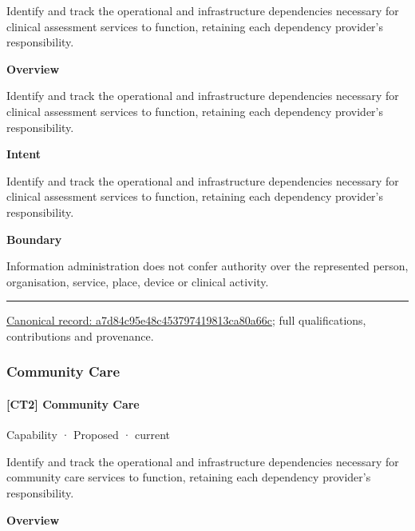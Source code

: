 Identify and track the operational and infrastructure dependencies necessary for clinical assessment services to function, retaining each dependency provider's responsibility.



\textbf{Overview}



Identify and track the operational and infrastructure dependencies necessary for clinical assessment services to function, retaining each dependency provider's responsibility.



\textbf{Intent}



Identify and track the operational and infrastructure dependencies necessary for clinical assessment services to function, retaining each dependency provider's responsibility.



\textbf{Boundary}



Information administration does not confer authority over the represented person, organisation, service, place, device or clinical activity.



\medskip\hrule\medskip

{\footnotesize \href{../../../../continuum/strategy/capability/a7d84c95e48c453797419813ca80a66c.md}{Canonical record: a7d84c95e48c453797419813ca80a66c}; full qualifications, contributions and provenance.}\par
\subsubsection{Community Care}

\paragraph{[CT2] Community Care}

\label{element:942aa78cad004ef99de6b3aae8ddd014}
{\small Capability · Proposed · current}\par

Identify and track the operational and infrastructure dependencies necessary for community care services to function, retaining each dependency provider's responsibility.



\textbf{Overview}



